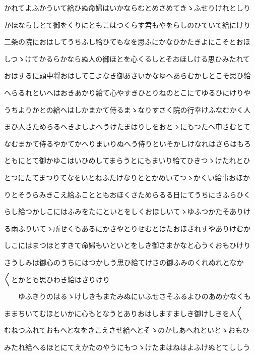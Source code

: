 \documentclass[a4paper,11pt,landscape]{ltjtarticle}
\begin{document}
\par\medskip
かれてよふかういて給ひぬ命婦はいかならむとめさめてきゝふせりけれとしり
\par\medskip
かほならしとて御をくりにともこはつくらす君もやをらしのひていて給にけり
\par\medskip
二条の院におはしてうちふし給ひてもなを思ふにかなひかたきよにこそとおほ
\par\medskip
しつゝけてかるらかならぬ人の御ほとを心くるしとそおほしける思ひみたれて
\par\medskip
おはするに頭中将おはしてこよなき御あさいかなゆへあらむかしとこそ思ひ給
\par\medskip
へらるれといへはおきあかり給て心やすきひとりねのとこにてゆるひにけりや
\par\medskip
うちよりかとの給へはしかまかて侍るまゝなりすさく院の行幸けふなむかく人
\par\medskip
まひ人さためらるへきよしよへうけたまはりしをおとゝにもつたへ申さむとて
\par\medskip
なむまかて侍るやかてかへりまいりぬへう侍りといそかしけなれはさらはもろ
\par\medskip
ともにとて御かゆこはいひめしてまらうとにもまいり給てひきつゝけたれとひ
\par\medskip
とつにたてまつりてなをいとねふたけなりととかめいてつゝかくい給事おほか
\par\medskip
りとそうらみきこえ給ふことともおほくさためらるる日にてうちにさふらひく
\par\medskip
らし給つかしこにはふみをたにといとをしくおほしいてゝゆふつかたそありけ
\par\medskip
る雨ふりいてゝ所せくもあるにかさやとりせむとはたおほされすやありけむか
\par\medskip
しこにはまつほとすきて命婦もいといとをしき御さまかなと心うくおもひけり
\par\medskip
さうしみは御心のうちにはつかしう思ひ給てけさの御ふみのくれぬれとなか
\par\medskip
〱とかとも思ひわき給はさりけり
\par\medskip
　　ゆふきりのはるゝけしきもまたみぬにいふせさそふるよひのあめかなくも
\par\medskip
ままちいてむほといかに心もとなうとありおはしますましき御けしきを人〱
\par\medskip
むねつふれておもへとなをきこえさせ給へとそゝのかしあへれといとゝおもひ
\par\medskip
みたれ給へるほとにてえかたのやうにもつゝけたまはねはよふけぬとてししう
\par\medskip
\end{document}
